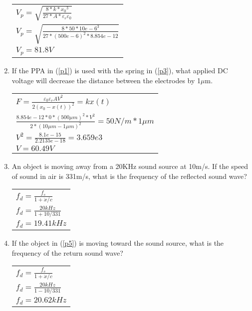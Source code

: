 \documentclass{article}
\begin{document}
\begin{multicols}{2}
\begin{enumerate}
		\begin{tabular}{ l }
			$V_p = \sqrt{\frac{8*k*{x_0}^3}{27*A*\varepsilon_r\varepsilon_0}}$\\
			$V_p = \sqrt{\frac{8*50*{10e-6}^3}{27*(500e-6)^2*8.854e-12}}$\\
			$V_p = 81.8V$
		\end{tabular}
\item\label{p4}
	If the PPA in (\ref{p1}) is used with the spring in (\ref{p3}), what applied DC voltage will
     decrease the distance between the electrodes by 1$\mu$m.

		\begin{tabular}{ l }
			$F = \frac{\varepsilon_0 \varepsilon_r A V^2}{2 (x_0 - x(t))^2} = k x(t)$\\
			$\frac{8.854e-12*0*(500\mu m)^2*V^2}{2*(10\mu m - 1\mu m)^2} = 50 N/m * 1\mu m$\\
			$V^2 = \frac{8.1e-15}{2.2135e-18} = 3.659e3$\\
			$V = 60.49 V$
		\end{tabular}
  
\item\label{p5}
     An object is moving away from a 20KHz sound source at 10m/s. If the speed of
     sound in air is 331m/s, what is the frequency of the reflected sound wave?

		\begin{tabular}{ l }
			$f_d = \frac{f_s}{1+\dot{x}/c}$\\
			$f_d = \frac{20kHz}{1+10/331}$\\
			$f_d = 19.41kHz$
		\end{tabular}
  
\item\label{p6}
	If the object in (\ref{p5}) is moving toward the sound source, what is the frequency of
     the return sound wave?

		\begin{tabular}{ l }
			$f_d = \frac{f_s}{1+\dot{x}/c}$\\
			$f_d = \frac{20kHz}{1-10/331}$\\
			$f_d = 20.62kHz$
		\end{tabular}

\end{enumerate}
\end{multicols}
\label{end}
\end{document}
